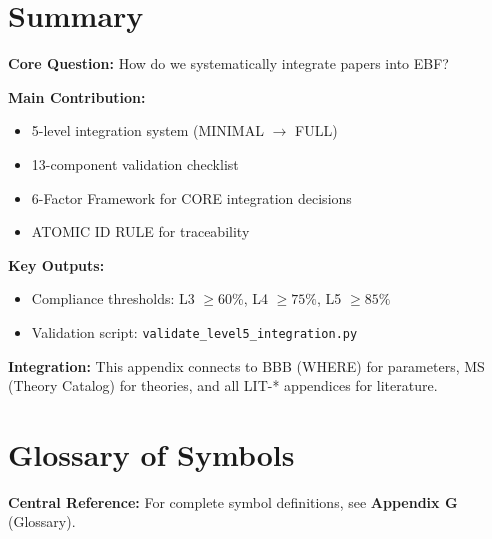 \section{Summary}
\label{sec:paperint-summary}

\begin{tcolorbox}[colback=green!10!white, colframe=green!75!black,
    title=\textbf{Appendix UNMAPPED_VB: Summary}]

\textbf{Core Question:} How do we systematically integrate papers into EBF?

\textbf{Main Contribution:}
\begin{itemize}[nosep]
    \item 5-level integration system (MINIMAL $\rightarrow$ FULL)
    \item 13-component validation checklist
    \item 6-Factor Framework for CORE integration decisions
    \item ATOMIC ID RULE for traceability
\end{itemize}

\textbf{Key Outputs:}
\begin{itemize}[nosep]
    \item Compliance thresholds: L3 $\geq 60\%$, L4 $\geq 75\%$, L5 $\geq 85\%$
    \item Validation script: \texttt{validate\_level5\_integration.py}
\end{itemize}

\textbf{Integration:} This appendix connects to BBB (WHERE) for parameters,
MS (Theory Catalog) for theories, and all LIT-* appendices for literature.

\end{tcolorbox}


\section{Glossary of Symbols}
\label{sec:paperint-glossary}

\begin{tcolorbox}[colback=blue!5!white, colframe=blue!75!black]
\textbf{Central Reference:} For complete symbol definitions, see
\textbf{Appendix G} (Glossary).
\end{tcolorbox}

